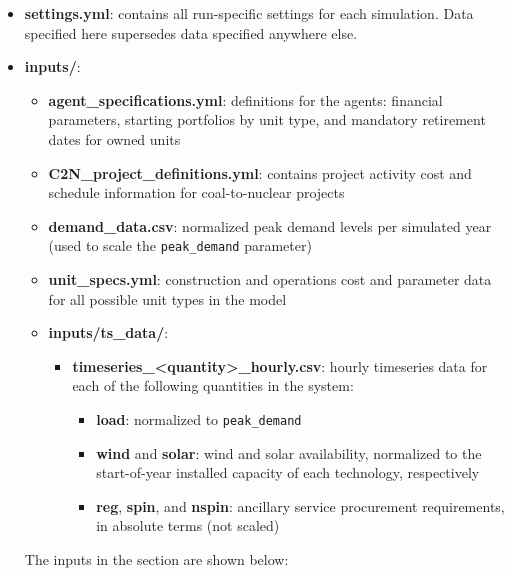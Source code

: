 \begin{itemize}
  \item \textbf{settings.yml}: contains all run-specific settings for each simulation. Data specified here supersedes data specified anywhere else.
  \item \textbf{inputs/}:
  \begin{itemize}
    \item \textbf{agent\_specifications.yml}: definitions for the agents: financial parameters, starting portfolios by unit type, and mandatory retirement dates for owned units
    \item \textbf{C2N\_project\_definitions.yml}: contains project activity cost and schedule information for coal-to-nuclear projects
    \item \textbf{demand\_data.csv}: normalized peak demand levels per simulated year (used to scale the \texttt{peak\_demand} parameter)
    \item \textbf{unit\_specs.yml}: construction and operations cost and parameter data for all possible unit types in the model
    \item \textbf{inputs/ts\_data/}:
    \begin{itemize}
      \item \textbf{timeseries\_<quantity>\_hourly.csv}: hourly timeseries data for each of the following quantities in the system:
      \begin{itemize}
        \item \textbf{load}: normalized to \texttt{peak\_demand}
        \item \textbf{wind} and \textbf{solar}: wind and solar availability, normalized to the start-of-year installed capacity of each technology, respectively
        \item \textbf{reg}, \textbf{spin}, and \textbf{nspin}: ancillary service procurement requirements, in absolute terms (not scaled)
      \end{itemize}
    \end{itemize}
  \end{itemize}



The inputs in the  section are shown below:


\end{itemize}
